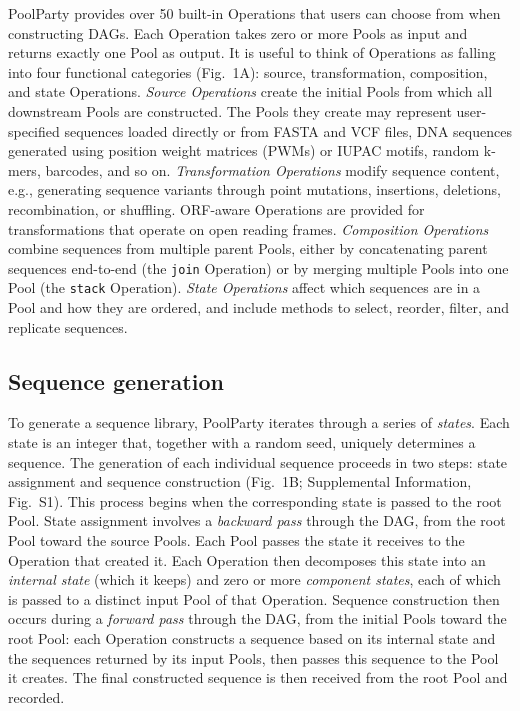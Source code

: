 PoolParty provides over 50 built-in Operations that users can choose from when constructing DAGs. Each Operation takes zero or more Pools as input and returns exactly one Pool as output. It is useful to think of Operations as falling into four functional categories (Fig.~1A): source, transformation, composition, and state Operations. \emph{Source Operations} create the initial Pools from which all downstream Pools are constructed. The Pools they create may represent user-specified sequences loaded directly or from FASTA and VCF files, DNA sequences generated using position weight matrices (PWMs) or IUPAC motifs, random k-mers, barcodes, and so on. \emph{Transformation Operations} modify sequence content, e.g., generating sequence variants through point mutations, insertions, deletions, recombination, or shuffling. ORF-aware Operations are provided for transformations that operate on open reading frames. \emph{Composition Operations} combine sequences from multiple parent Pools, either by concatenating parent sequences end-to-end (the \texttt{join} Operation) or by merging multiple Pools into one Pool (the \texttt{stack} Operation). \emph{State Operations} affect which sequences are in a Pool and how they are ordered, and include methods to select, reorder, filter, and replicate sequences. 

\subsection*{Sequence generation}\label{subsec:sequence-generation}

To generate a sequence library, PoolParty iterates through a series of \emph{states}. Each state is an integer that, together with a random seed, uniquely determines a sequence. The generation of each individual sequence proceeds in two steps: state assignment and sequence construction (Fig.~1B; Supplemental Information, Fig.~S1). This process begins when the corresponding state is passed to the root Pool. State assignment involves a \emph{backward pass} through the DAG, from the root Pool toward the source Pools. Each Pool passes the state it receives to the Operation that created it. Each Operation then decomposes this state into an \emph{internal state} (which it keeps) and zero or more \emph{component states}, each of which is passed to a distinct input Pool of that Operation. Sequence construction then occurs during a \emph{forward pass} through the DAG, from the initial Pools toward the root Pool: each Operation constructs a sequence based on its internal state and the sequences returned by its input Pools, then passes this sequence to the Pool it creates. The final constructed sequence is then received from the root Pool and recorded.

